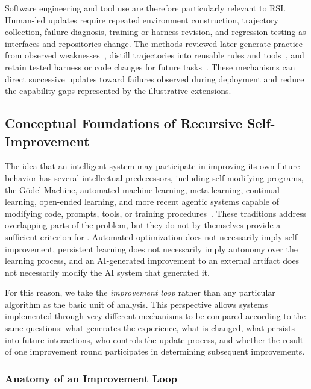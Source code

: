 Software engineering and tool use are therefore particularly relevant to RSI. Human-led updates require repeated environment construction, trajectory collection, failure diagnosis, training or harness revision, and regression testing as interfaces and repositories change. The methods reviewed later generate practice from observed weaknesses~\cite{sun2026seagent}, distill trajectories into reusable rules and tools~\cite{li2026pando,dai2026metis}, and retain tested harness or code changes for future tasks~\cite{zhang2026selfharness,lin2026ahe}. These mechanisms can direct successive updates toward failures observed during deployment and reduce the capability gaps represented by the illustrative extensions.

\subsection{Conceptual Foundations of Recursive Self-Improvement}

The idea that an intelligent system may participate in improving its own future behavior has several intellectual predecessors, including self-modifying programs, the G\"odel Machine, automated machine learning, meta-learning, continual learning, open-ended learning, and more recent agentic systems capable of modifying code, prompts, tools, or training procedures~\cite{schmidhuber2003godel,ye2026ai4ai,shi2025continual,wang2019poet,hu2025adas,zhang2025aflow}. These traditions address overlapping parts of the problem, but they do not by themselves provide a sufficient criterion for \RSI. Automated optimization does not necessarily imply self-improvement, persistent learning does not necessarily imply autonomy over the learning process, and an AI-generated improvement to an external artifact does not necessarily modify the AI system that generated it.

For this reason, we take the \emph{improvement loop} rather than any particular algorithm as the basic unit of analysis. This perspective allows systems implemented through very different mechanisms to be compared according to the same questions: what generates the experience, what is changed, what persists into future interactions, who controls the update process, and whether the result of one improvement round participates in determining subsequent improvements.



\subsubsection{Anatomy of an Improvement Loop}

